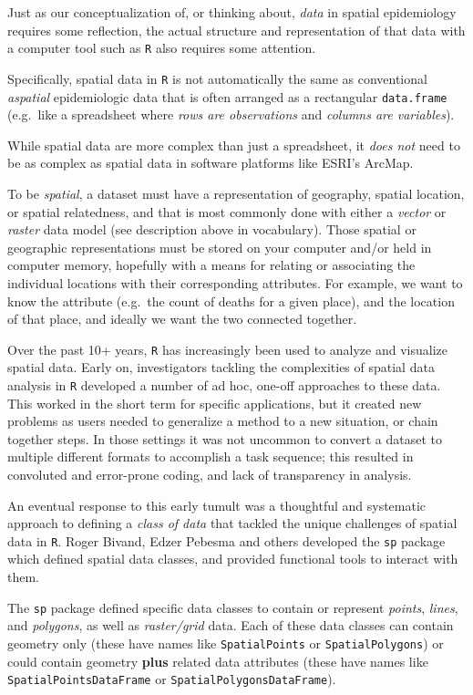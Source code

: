 \documentclass[
]{book}
\begin{document}
Just as our conceptualization of, or thinking about, \emph{data} in spatial epidemiology requires some reflection, the actual structure and representation of that data with a computer tool such as \texttt{R} also requires some attention.

Specifically, spatial data in \texttt{R} is not automatically the same as conventional \emph{aspatial} epidemiologic data that is often arranged as a rectangular \texttt{data.frame} (e.g.~like a spreadsheet where \emph{rows are observations} and \emph{columns are variables}).

While spatial data are more complex than just a spreadsheet, it \emph{does not} need to be as complex as spatial data in software platforms like ESRI's ArcMap.

To be \emph{spatial}, a dataset must have a representation of geography, spatial location, or spatial relatedness, and that is most commonly done with either a \emph{vector} or \emph{raster} data model (see description above in vocabulary). Those spatial or geographic representations must be stored on your computer and/or held in computer memory, hopefully with a means for relating or associating the individual locations with their corresponding attributes. For example, we want to know the attribute (e.g.~the count of deaths for a given place), and the location of that place, and ideally we want the two connected together.

Over the past 10+ years, \texttt{R} has increasingly been used to analyze and visualize spatial data. Early on, investigators tackling the complexities of spatial data analysis in \texttt{R} developed a number of ad hoc, one-off approaches to these data. This worked in the short term for specific applications, but it created new problems as users needed to generalize a method to a new situation, or chain together steps. In those settings it was not uncommon to convert a dataset to multiple different formats to accomplish a task sequence; this resulted in convoluted and error-prone coding, and lack of transparency in analysis.

An eventual response to this early tumult was a thoughtful and systematic approach to defining a \emph{class of data} that tackled the unique challenges of spatial data in \texttt{R}. Roger Bivand, Edzer Pebesma and others developed the \texttt{sp} package which defined spatial data classes, and provided functional tools to interact with them.

The \texttt{sp} package defined specific data classes to contain or represent \emph{points}, \emph{lines}, and \emph{polygons}, as well as \emph{raster/grid} data. Each of these data classes can contain geometry only (these have names like \texttt{SpatialPoints} or \texttt{SpatialPolygons}) or could contain geometry \textbf{plus} related data attributes (these have names like \texttt{SpatialPointsDataFrame} or \texttt{SpatialPolygonsDataFrame}).
\end{document}

